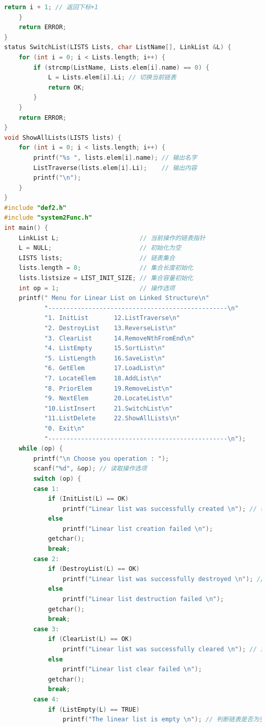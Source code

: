 \documentclass[supercite]{Experimental_Report}
\theoremstyle{definition}
\begin{document}
\begin{lstlisting}[language=c]
            return i + 1; // 返回下标+1
    }
    return ERROR;
}
status SwitchList(LISTS Lists, char ListName[], LinkList &L) {
    for (int i = 0; i < Lists.length; i++) {
        if (strcmp(ListName, Lists.elem[i].name) == 0) {
            L = Lists.elem[i].Li; // 切换当前链表
            return OK;
        }
    }
    return ERROR;
}
void ShowAllLists(LISTS lists) {
    for (int i = 0; i < lists.length; i++) {
        printf("%s ", lists.elem[i].name); // 输出名字
        ListTraverse(lists.elem[i].Li);    // 输出内容
        printf("\n");
    }
}
#include "def2.h"
#include "system2Func.h"
int main() {
    LinkList L;                      // 当前操作的链表指针
    L = NULL;                        // 初始化为空
    LISTS lists;                     // 链表集合
    lists.length = 0;                // 集合长度初始化
    lists.listsize = LIST_INIT_SIZE; // 集合容量初始化
    int op = 1;                      // 操作选项
    printf(" Menu for Linear List on Linked Structure\n"
           "-------------------------------------------------\n"
           "1. InitList       12.ListTraverse\n"
           "2. DestroyList    13.ReverseList\n"
           "3. ClearList      14.RemoveNthFromEnd\n"
           "4. ListEmpty      15.SortList\n"
           "5. ListLength     16.SaveList\n"
           "6. GetElem        17.LoadList\n"
           "7. LocateElem     18.AddList\n"
           "8. PriorElem      19.RemoveList\n"
           "9. NextElem       20.LocateList\n"
           "10.ListInsert     21.SwitchList\n"
           "11.ListDelete     22.ShowAllLists\n"
           "0. Exit\n"
           "-------------------------------------------------\n");
    while (op) {
        printf("\n Choose you operation : ");
        scanf("%d", &op); // 读取操作选项
        switch (op) {
        case 1:
            if (InitList(L) == OK)
                printf("Linear list was successfully created \n"); // 初始化链表
            else
                printf("Linear list creation failed \n");
            getchar();
            break;
        case 2:
            if (DestroyList(L) == OK)
                printf("Linear list was successfully destroyed \n"); // 销毁链表
            else
                printf("Linear list destruction failed \n");
            getchar();
            break;
        case 3:
            if (ClearList(L) == OK)
                printf("Linear list was successfully cleared \n"); // 清空链表
            else
                printf("Linear list clear failed \n");
            getchar();
            break;
        case 4:
            if (ListEmpty(L) == TRUE)
                printf("The linear list is empty \n"); // 判断链表是否为空

\end{lstlisting}
\end{document}
